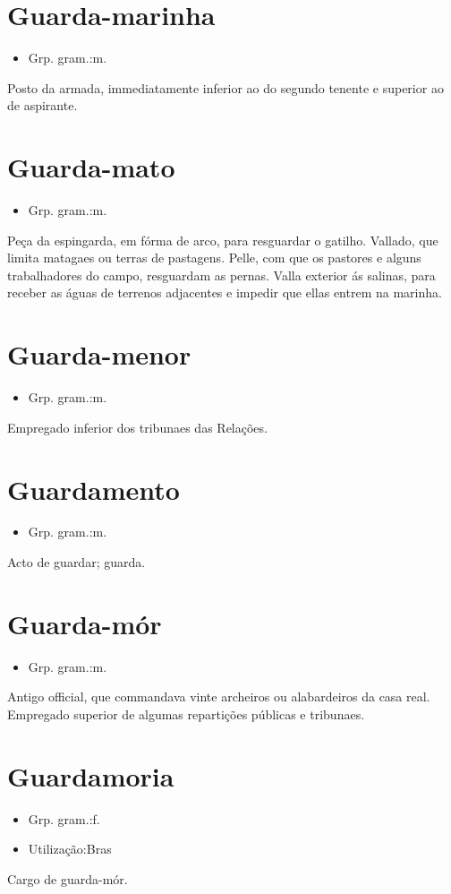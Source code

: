 \section{Guarda-marinha}
\begin{itemize}
\item {Grp. gram.:m.}
\end{itemize}
Posto da armada, immediatamente inferior ao do segundo tenente e superior ao de aspirante.
\section{Guarda-mato}
\begin{itemize}
\item {Grp. gram.:m.}
\end{itemize}
Peça da espingarda, em fórma de arco, para resguardar o gatilho.
Vallado, que limita matagaes ou terras de pastagens.
Pelle, com que os pastores e alguns trabalhadores do campo, resguardam as pernas.
Valla exterior ás salinas, para receber as águas de terrenos adjacentes e impedir que ellas entrem na marinha.
\section{Guarda-menor}
\begin{itemize}
\item {Grp. gram.:m.}
\end{itemize}
Empregado inferior dos tribunaes das Relações.
\section{Guardamento}
\begin{itemize}
\item {Grp. gram.:m.}
\end{itemize}
Acto de guardar; guarda.
\section{Guarda-mór}
\begin{itemize}
\item {Grp. gram.:m.}
\end{itemize}
Antigo official, que commandava vinte archeiros ou alabardeiros da casa real.
Empregado superior de algumas repartições públicas e tribunaes.
\section{Guardamoria}
\begin{itemize}
\item {Grp. gram.:f.}
\end{itemize}
\begin{itemize}
\item {Utilização:Bras}
\end{itemize}
Cargo de guarda-mór.

